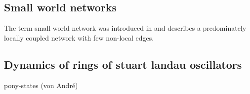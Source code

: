 \subsection{Small world networks}
	The term small world network was introduced in \cite{WAT98a} and describes a predominately locally coupled network with few non-local edges. 
	

\subsection{Dynamics of rings of stuart landau oscillators}
	pony-states (von André)
	
	

